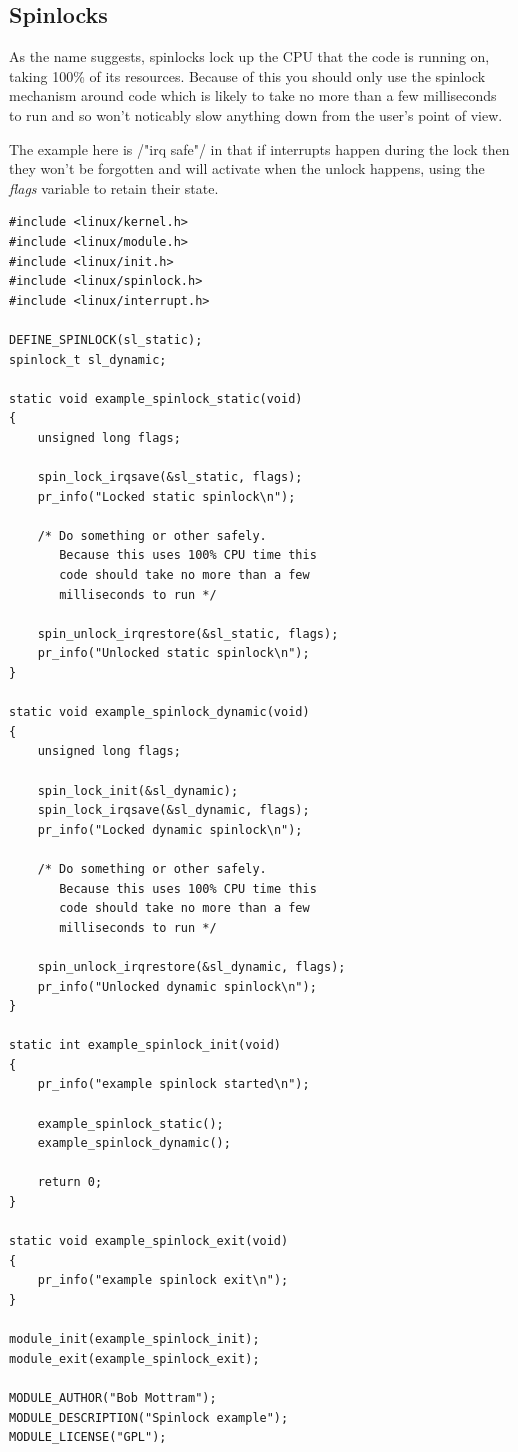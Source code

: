 \documentclass[11pt]{article}
\begin{document}
\subsection*{Spinlocks}
\label{sec-12-2}
As the name suggests, spinlocks lock up the CPU that the code is running on, taking 100\% of its resources. Because of this you should only use the spinlock mechanism around code which is likely to take no more than a few milliseconds to run and so won't noticably slow anything down from the user's point of view.

The example here is /"irq safe"/ in that if interrupts happen during the lock then they won't be forgotten and will activate when the unlock happens, using the \emph{flags} variable to retain their state.

\begin{verbatim}
#include <linux/kernel.h>
#include <linux/module.h>
#include <linux/init.h>
#include <linux/spinlock.h>
#include <linux/interrupt.h>

DEFINE_SPINLOCK(sl_static);
spinlock_t sl_dynamic;

static void example_spinlock_static(void)
{
    unsigned long flags;

    spin_lock_irqsave(&sl_static, flags);
    pr_info("Locked static spinlock\n");

    /* Do something or other safely.
       Because this uses 100% CPU time this
       code should take no more than a few
       milliseconds to run */

    spin_unlock_irqrestore(&sl_static, flags);
    pr_info("Unlocked static spinlock\n");
}

static void example_spinlock_dynamic(void)
{
    unsigned long flags;

    spin_lock_init(&sl_dynamic);
    spin_lock_irqsave(&sl_dynamic, flags);
    pr_info("Locked dynamic spinlock\n");

    /* Do something or other safely.
       Because this uses 100% CPU time this
       code should take no more than a few
       milliseconds to run */

    spin_unlock_irqrestore(&sl_dynamic, flags);
    pr_info("Unlocked dynamic spinlock\n");
}

static int example_spinlock_init(void)
{
    pr_info("example spinlock started\n");

    example_spinlock_static();
    example_spinlock_dynamic();

    return 0;
}

static void example_spinlock_exit(void)
{
    pr_info("example spinlock exit\n");
}

module_init(example_spinlock_init);
module_exit(example_spinlock_exit);

MODULE_AUTHOR("Bob Mottram");
MODULE_DESCRIPTION("Spinlock example");
MODULE_LICENSE("GPL");
\end{verbatim}
\end{document}
